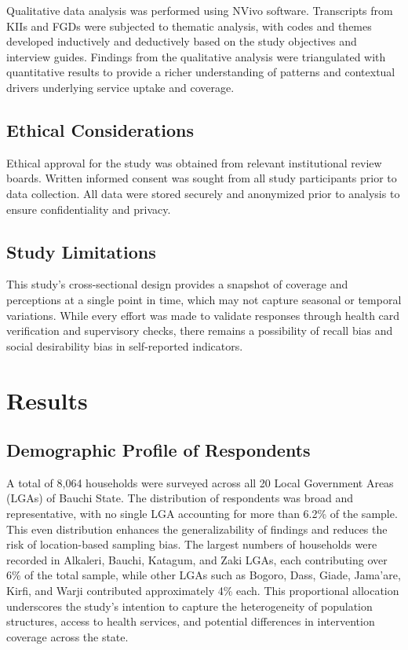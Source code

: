 \documentclass[
  11pt,
]{report}
\begin{document}
Qualitative data analysis was performed using NVivo software.
Transcripts from KIIs and FGDs were subjected to thematic analysis, with
codes and themes developed inductively and deductively based on the
study objectives and interview guides. Findings from the qualitative
analysis were triangulated with quantitative results to provide a richer
understanding of patterns and contextual drivers underlying service
uptake and coverage.

\section{Ethical Considerations}\label{ethical-considerations}

Ethical approval for the study was obtained from relevant institutional
review boards. Written informed consent was sought from all study
participants prior to data collection. All data were stored securely and
anonymized prior to analysis to ensure confidentiality and privacy.

\section{Study Limitations}\label{study-limitations}

This study's cross-sectional design provides a snapshot of coverage and
perceptions at a single point in time, which may not capture seasonal or
temporal variations. While every effort was made to validate responses
through health card verification and supervisory checks, there remains a
possibility of recall bias and social desirability bias in self-reported
indicators.

\chapter{Results}\label{results}

\section{Demographic Profile of
Respondents}\label{demographic-profile-of-respondents}

A total of 8,064 households were surveyed across all 20 Local Government
Areas (LGAs) of Bauchi State. The distribution of respondents was broad
and representative, with no single LGA accounting for more than 6.2\% of
the sample. This even distribution enhances the generalizability of
findings and reduces the risk of location-based sampling bias. The
largest numbers of households were recorded in Alkaleri, Bauchi,
Katagum, and Zaki LGAs, each contributing over 6\% of the total sample,
while other LGAs such as Bogoro, Dass, Giade, Jama'are, Kirfi, and Warji
contributed approximately 4\% each. This proportional allocation
underscores the study's intention to capture the heterogeneity of
population structures, access to health services, and potential
differences in intervention coverage across the state.
\end{document}
